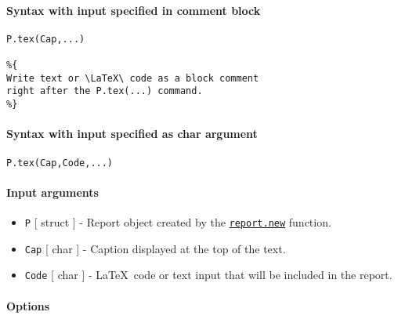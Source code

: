 


	\paragraph{Syntax with input specified in comment
block}\label{syntax-with-input-specified-in-comment-block}

\begin{verbatim}
P.tex(Cap,...)

%{
Write text or \LaTeX\ code as a block comment
right after the P.tex(...) command.
%}
\end{verbatim}

\paragraph{Syntax with input specified as char
argument}\label{syntax-with-input-specified-as-char-argument}

\begin{verbatim}
P.tex(Cap,Code,...)
\end{verbatim}

\paragraph{Input arguments}\label{input-arguments}

\begin{itemize}
\item
  \texttt{P} {[} struct {]} - Report object created by the
  \href{report/new}{\texttt{report.new}} function.
\item
  \texttt{Cap} {[} char {]} - Caption displayed at the top of the text.
\item
  \texttt{Code} {[} char {]} - \LaTeX~code or text input that will be
  included in the report.
\end{itemize}

\paragraph{Options}\label{options}

